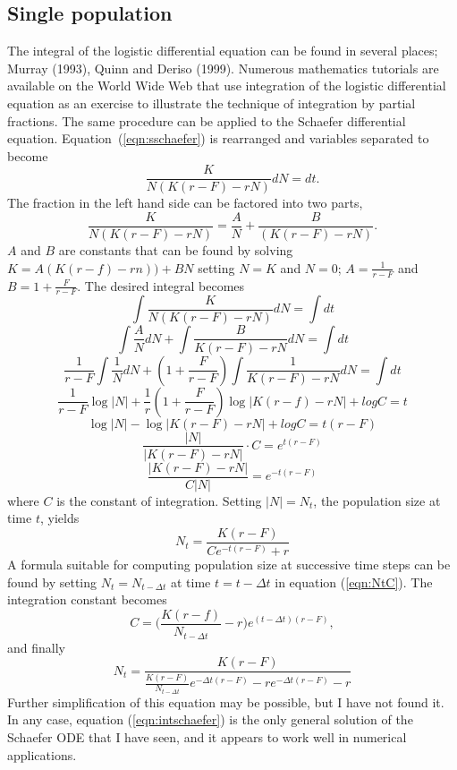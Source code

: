 \subsection{Single population}
The integral of the logistic differential equation can be found in
several places;
Murray (1993), Quinn and Deriso (1999).
Numerous mathematics tutorials are available on the World Wide Web
that use
integration of the logistic differential equation as an exercise to
illustrate the technique of integration by partial fractions.
The same procedure can be applied to the Schaefer differential
equation.
Equation~(\ref{eqn:sschaefer}) is rearranged and variables
separated to become
\begin{equation}
\frac{K}{N(K(r-F)-rN)}dN=dt.
\end{equation}
The fraction in the left hand side can be factored into two parts,
\begin{equation}
\frac{K}{N(K(r-F)-rN)}=\frac{A}{N}+\frac{B}{(K(r-F)-rN)}.
\end{equation}
$A$ and $B$ are constants that can be found by solving
$K=A(K(r-f)-rn))+BN$
setting $N=K$ and $N=0$; 
$A=\frac{1}{r-F}$ and $B=1+\frac{F}{r-F}$.
The desired integral becomes
\[\int\frac{K}{N(K(r-F)-rN)}dN   = \int dt\]
\[\int\frac{A}{N}dN + \int\frac{B}{K(r-F)-rN}dN  = \int dt\]
\[\frac{1}{r-F}\int\frac{1}{N}dN + (1+\frac{F}{r-F})\int\frac{1}{K(r-F)-rN}dN  = \int dt\] 
\[\frac{1}{r-F}\log |N| + \frac{1}{r}(1+\frac{F}{r-F})\log |K(r-f)-rN| +log C  = t\] \[\log |N| - \log |K(r-F)-rN| + log C  = t(r-F)\]
\[\frac{|N|}{|K(r-F)-rN|}\cdot C  =  e^{t(r-F)}\]
\[\frac{|K(r-F)-rN|}{C|N|} =  e^{-t(r-F)}\]
where $C$ is the constant of integration.
Setting $|N| = N_t$, the population size at time $t$, yields
\begin{equation}
\label{eqn:NtC}
N_t=\frac{K(r-F)}{Ce^{-t(r-F)}+r}
\end{equation}
A formula suitable for computing population size at successive
time steps can be found by setting $N_t = N_{t-\Delta t}$ at time
$t=t-\Delta t$ in equation (\ref{eqn:NtC}).
The integration constant becomes
\begin{equation}
C=\Bigg(\frac{K(r-f)}{N_{t-\Delta t}}-r\Bigg)e^{(t-\Delta t)(r-F)},
\end{equation}
and finally
\begin{equation}
\label{eqn:intschaefer}
N_t = \frac{K(r-F)}{\frac{K(r-F)}{N_{t-\Delta t}}e^{-\Delta t(r-F)}-re^{-\Delta t(r-F)} -r}
\end{equation}
Further simplification of this equation may be possible, but I have
not found it. In any case, equation (\ref{eqn:intschaefer}) is the
only general solution of the Schaefer ODE that I have seen, and it appears
to work well in numerical applications.

